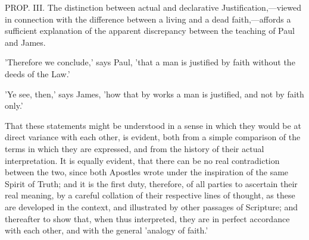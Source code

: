 \documentclass[
]{book}
\begin{document}
PROP. III. The distinction between actual and declarative Justification,---viewed in connection with the difference between a living and a dead faith,---affords a sufficient explanation of the apparent discrepancy between the teaching of Paul and James.

'Therefore we conclude,' says Paul, 'that a man is justified by faith without the deeds of the Law.'

'Ye see, then,' says James, 'how that by works a man is justified, and not by faith only.'

That these statements might be understood in a sense in which they would be at direct variance with each other, is evident, both from a simple comparison of the terms in which they are expressed, and from the history of their actual interpretation. It is equally evident, that there can be no real contradiction between the two, since both Apostles wrote under the inspiration of the same Spirit of Truth; and it is the first duty, therefore, of all parties to ascertain their real meaning, by a careful collation of their respective lines of thought, as these are developed in the context, and illustrated by other passages of Scripture; and thereafter to show that, when thus interpreted, they are in perfect accordance with each other, and with the general 'analogy of faith.'
\end{document}
